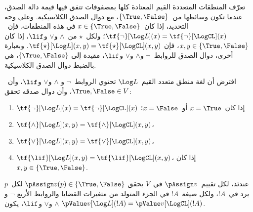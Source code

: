 \documentclass[../../../include/open-logic-section]{subfiles}
\begin{document}


تعرّف المنطقات المتعددة القيم المعتادة كلها بمصفوفات تتفق فيها قيمة
دالة الصدق، عندما تكون وسائطها من~$\{\True, \False\}$، مع دوال الصدق
الكلاسيكية. وعلى وجه التحديد، إذا كان~$x \in \{\True, \False\}$ في
هذه المنطقات، فإن~$\tf{\lnot}[\Log L](x) = \tf{\lnot}[\LogCL](x)$؛
ولكل~$\star$ من~$\land$ و$\lor$ و$\lif$، إذا كان
$x, y \in \{\True, \False\}$، فإن
$\tf{\star}[\Log L](x,y) = \tf{\star}[\LogCL](x,y)$. وبعبارة أخرى،
دوال الصدق للروابط~$\lnot$ و$\land$ و$\lor$ و$\lif$، مقيدة إلى
$\{\True,\False\}$، هي بالضبط دوال الصدق الكلاسيكية.

\begin{prop}
  افترض أن لغة منطق متعدد القيم~$\Log L$ تحتوي الروابط~$\lnot$ و
  $\land$ و$\lor$ و$\lif$، وأن~$\True, \False \in V$، وأن دوال صدقه
  تحقق:
  \begin{enumerate}
    \item{} $\tf{\lnot}[\Log L](x) = \tf{\lnot}[\LogCL](x)$ إذا كان~$x =
    \True$ أو~$x = \False$؛
    \item{} $\tf{\land}[\Log L](x,y) = \tf{\land}[\LogCL](x,y)$،
    \item{} $\tf{\lor}[\Log L](x,y) = \tf{\lor}[\LogCL](x,y)$،
    \item{} $\tf{\lif}[\Log L](x,y) = \tf{\lif}[\LogCL](x,y)$،
    إذا كان~$x, y \in \{\True, \False\}$.
  \end{enumerate}
  عندئذ، لكل تقييم~$\pAssign v$ في~$V$ يحقق
  $\pAssign v(p) \in \{\True,\False\}$ لكل~$p$ يرد في~$!A$، ولكل
  صيغة~$!A$ في الجزء المتولد من متغيرات القضايا والروابط الأربع
  $\lnot$ و$\land$ و$\lor$ و$\lif$، يكون
  $\pValue v[\Log L](!A) = \pValue v[\LogCL](!A)$.
\end{prop}
\end{document}
